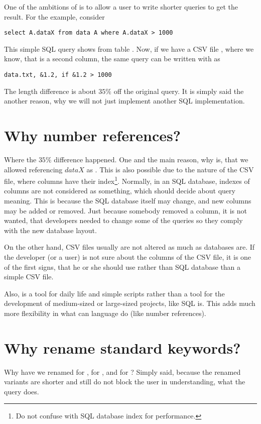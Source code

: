 One of the ambitions of  is to allow a user to write shorter queries to get the result. For the example,
consider

\begin{verbatim}
select A.dataX from data A where A.dataX > 1000
\end{verbatim}

This simple SQL query shows  from table . 
Now, if we have a CSV file , where we know, that  is a second column, the same query can 
be written with  as

\begin{verbatim}
data.txt, &1.2, if &1.2 > 1000
\end{verbatim}

The length difference is about $35\%$ off the original query. It is simply said the another reason, 
why we will not just implement another SQL implementation.

\section{Why number references?}
Where the $35\%$ difference happened. One and the main reason, why is, that we allowed referencing $dataX$ as .
This is also possible due to the nature of the CSV file, where columns have their index\footnote{Do not confuse with SQL database index for performance.}. 
Normally, in an SQL database, indexes of columns are not considered as something, which should decide about query meaning.
This is because the SQL database itself may change, and new columns may be added or removed. Just because somebody removed a column, 
it is not wanted, that developers needed to change some of the queries so they comply with the new database layout.

On the other hand, CSV files usually are not altered as much as databases are. 
If the developer (or a user) is not sure about the columns of the CSV file, it is one of the first signs, that
he or she should use rather than SQL database than a simple CSV file.

Also,  is a tool for daily life and simple scripts rather than a tool for the development of medium-sized or
large-sized projects, like SQL is. This adds much more flexibility in what can language do (like number references).

\section{Why rename standard keywords?}
Why have we renamed  for ,  for , and  for ? Simply said, because the renamed variants are shorter and still do not block the user in understanding, what the query does.


